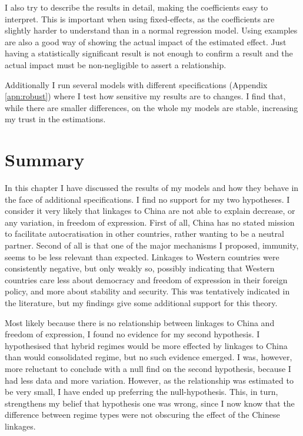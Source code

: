 I also try to describe the results in detail, making the coefficients easy to interpret. This is important when using fixed-effects, as the coefficients are slightly harder to understand than in a normal regression model. Using examples are also a good way of showing the actual impact of the estimated effect. Just having a statistically significant result is not enough to confirm a result and the actual impact must be non-negligible to assert a relationship. 

Additionally I run several models with different specifications (Appendix \ref{apn:robust}) where I test how sensitive my results are to changes. I find that, while there are smaller differences, on the whole my models are stable, increasing my trust in the estimations. 

\section{Summary}
In this chapter I have discussed the results of my models and how they behave in the face of additional specifications. I find no support for my two hypotheses. I consider it very likely that linkages to China are not able to explain decrease, or any variation, in freedom of expression. First of all, China has no stated mission to facilitate autocratisation in other countries, rather wanting to be a neutral partner. Second of all is that one of the major mechanisms I proposed, immunity, seems to be less relevant than expected. Linkages to Western countries were consistently negative, but only weakly so, possibly indicating that Western countries care less about democracy and freedom of expression in their foreign policy, and more about stability and security. This was tentatively indicated in the literature, but my findings give some additional support for this theory.

Most likely because there is no relationship between linkages to China and freedom of expression, I found no evidence for my second hypothesis. I hypothesised that hybrid regimes would be more effected by linkages to China than would consolidated regime, but no such evidence emerged. I was, however, more reluctant to conclude with a null find on the second hypothesis, because I had less data and more variation. However, as the relationship was estimated to be very small, I have ended up preferring the null-hypothesis. This, in turn, strengthens my belief that hypothesis one was wrong, since I now know that the difference between regime types were not obscuring the effect of the Chinese linkages.